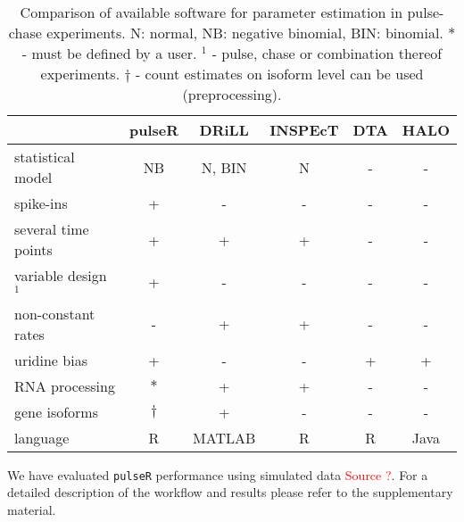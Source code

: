\begin{table}
 \begin{tabular}{|l|c|c|c|c|c|}\hline
                        &pulseR &DRiLL          &INSPEcT&DTA    &HALO       \\\hline
 statistical model      & NB    &N, BIN         &N       & -    & -      \\\hline                         
 spike-ins              & +     &   -           &  -     &  -    & -         \\\hline               
 several time points    & +     &   +           &  +     &  -    & -         \\\hline                    
  variable design $^1$       & +     &   -           &  -     &  -    & -         \\\hline 
 non-constant rates     & -     &   +           &  +     &  -    & -         \\\hline 
            uridine bias& +     &   -           &  -     &  +    & +         \\\hline 
       RNA processing   &$\ast$ &   +           &  +     &  -    & -         \\\hline 
       gene isoforms   & $\dagger$     &   +           &  -     &  -    & -         \\\hline 
  language              & R     &MATLAB         &  R     &  R    & Java      \\\hline 
 \end{tabular}
\caption{Comparison of available software for parameter estimation in 
pulse-chase experiments. N: normal, NB: negative binomial, BIN: binomial.
$\ast$ - must be defined by a user. $^1$ - pulse, chase or combination thereof experiments.
$\dagger$ - count estimates on isoform level can be used (preprocessing).
}
\end{table}
We have evaluated \verb|pulseR| performance using simulated data \textcolor{red}{Source ?}. 
For a detailed description of the workflow and results please refer to the supplementary material.

